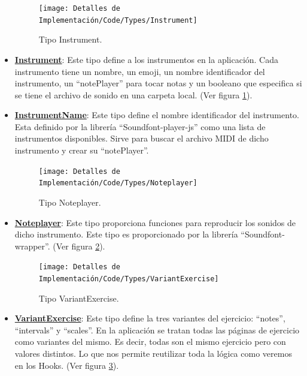 \documentclass[12pt,twoside,titlepage]{report}
\begin{document}
\begin{itemize}
    \begin{figure}[H]
        \centering
        \texttt{[image: Detalles de Implementación/Code/Types/Instrument]}
        \caption{Tipo Instrument.}
        \label{fig:Instrument}
    \end{figure}

    \item \href{https://github.com/alberttogoca/EarFit/blob/main/src/types/index.ts}{\textbf{Instrument}}: Este tipo define a los instrumentos en la aplicación. Cada instrumento tiene un nombre, un emoji, un nombre identificador del instrumento, un ``notePlayer'' para tocar notas y un booleano que especifica si se tiene el archivo de sonido en una carpeta local. (Ver figura \ref{fig:Instrument}).
    \item \href{https://github.com/alberttogoca/EarFit/blob/main/src/types/index.ts}{\textbf{InstrumentName}}: Este tipo define el nombre identificador del instrumento. Esta definido por la librería ``Soundfont-player-js'' como una lista de instrumentos disponibles. Sirve para buscar el archivo MIDI de dicho instrumento y crear su ``notePlayer''. %
    
    \begin{figure}[H]
        \centering
        \texttt{[image: Detalles de Implementación/Code/Types/Noteplayer]}
        \caption{Tipo Noteplayer.}
        \label{fig:Noteplayer}
    \end{figure}

    \item \href{https://github.com/alberttogoca/EarFit/blob/main/src/types/index.ts}{\textbf{Noteplayer}}: Este tipo proporciona funciones para reproducir los sonidos de dicho instrumento. Este tipo es proporcionado por la librería ``Soundfont-wrapper''. (Ver figura \ref{fig:Noteplayer}).

    \begin{figure}[H]
        \centering
        \texttt{[image: Detalles de Implementación/Code/Types/VariantExercise]}
        \caption{Tipo VariantExercise.}
        \label{fig:VariantExercise}
    \end{figure}

    \item \href{https://github.com/alberttogoca/EarFit/blob/main/src/types/index.ts}{\textbf{VariantExercise}}: Este tipo define la tres variantes del ejercicio: ``notes'', ``intervals'' y ``scales''. En la aplicación se tratan todas las páginas de ejercicio como variantes del mismo. Es decir, todas son el mismo ejercicio pero con valores distintos. Lo que nos permite reutilizar toda la lógica como veremos en los Hooks.
    (Ver figura \ref{fig:VariantExercise}).


\end{itemize}
\end{document}
